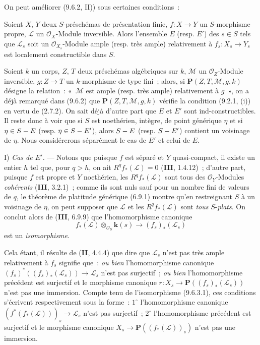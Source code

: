 On peut améliorer (9.6.2, II)) sous certaines conditions~:

\begin{proposition}[9.6.3]
\label{IV.9.6.3-fr}
Soient $X$, $Y$ deux $S$-préschémas de présentation finie, $f:X\to Y$ un
$S$-morphisme \textup{propre}, $\mathcal L$ un $\mathcal O_X$-Module inversible. Alors
l'ensemble $E$ \textup{(resp.} $E'$\textup{)} des $s\in S$ tels que $\mathcal L_s$ soit un
$\mathcal O_{X_s}$-Module ample \textup{(resp.} très ample\textup{)} relativement à
$f_s:X_s\to Y_s$ est localement constructible dans $S$.
\end{proposition}

Soient $k$ un corps, $Z$, $T$ deux préschémas algébriques sur $k$, $\mathcal M$
un $\mathcal O_Z$-Module inversible, $g:Z\to T$ un $k$-morphisme de type fini~;
alors, si $\boldsymbol{P}(Z,T,\mathcal M,g,k)$ désigne la relation~: «~$\mathcal M$ est ample
(resp. très ample) relativement à $g$~», on a déjà remarqué dans (9.6.2) que
$\boldsymbol{P}(Z,T,\mathcal M,g,k)$ vérifie la condition (9.2.1, (i)) en vertu de (2.7.2).
On sait déjà d'autre part que $E$ et $E'$ sont ind-constructibles. Il reste donc
à voir que si $S$ est noethérien, intègre, de point générique $\eta$ et si
$\eta\in S- E$ (resp. $\eta\in S- E'$), alors $S- E$ (resp. $S- E'$) contient un
voisinage de $\eta$. Nous considérerons séparément le cas de $E'$ et celui de
$E$.

I) \emph{Cas de $E'$.} --- Notons que puisque $f$ est séparé et $Y$
quasi-compact, il existe un entier $h$ tel que, pour $q>h$, on ait
$R^qf_*(\mathcal L)=0$ (\textbf{III}, 1.4.12)~; d'autre part, puisque $f$ est
propre et $Y$ noethérien, les $R^qf_*(\mathcal L)$ sont tous des
$\mathcal O_Y$-Modules \emph{cohérents} (\textbf{III}, 3.2.1)~; comme ils sont nuls
sauf pour un nombre fini de valeurs de $q$, le théorème de platitude générique
(6.9.1) montre qu'en restreignant $S$ à un voisinage de $\eta$, on peut
supposer que $\mathcal L$ et les $R^qf_*(\mathcal L)$ sont \emph{tous} $S$-\emph{plats}. On
conclut alors de (\textbf{III}, 6.9.9) que l'homomorphisme canonique
\begin{equation}
\label{IV.9.6.3.1-fr}
 f_*(\mathcal L)\otimes_{\mathcal O_S} \boldsymbol{k}(s)
 \longrightarrow (f_s)_*(\mathcal L_s)
 \tag{9.6.3.1}
\end{equation}
est un \emph{isomorphisme}.


Cela étant, il résulte de (\textbf{II}, 4.4.4) que dire que $\mathcal L_s$
n'est pas très ample relativement à $f_s$ signifie que~: \emph{ou bien}
l'homomorphisme canonique
$(f_s)^*((f_s)_*(\mathcal L_s))\to\mathcal L_s$ n'est pas surjectif~; \emph{ou
bien} l'homomorphisme précédent est surjectif et le morphisme canonique
$r:X_s\to\mathbf P((f_s)_*(\mathcal L_s))$ n'est pas une immersion. Compte
tenu de l'isomorphisme (9.6.3.1), ces conditions s'écrivent respectivement sous
la forme~: $1^\circ$ l'homomorphisme canonique
$(f^*(f_*(\mathcal L)))_s\to\mathcal L_s$ n'est pas surjectif~; $2^\circ$
l'homomorphisme précédent est surjectif et le morphisme canonique
$X_s\to\mathbf P((f_*(\mathcal L))_s)$ n'est pas une immersion.

